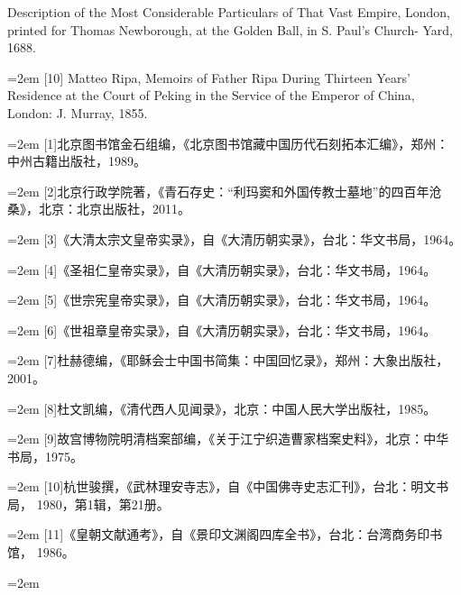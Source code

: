 Description of the Most Considerable Particulars of That Vast Empire, London,%
\space%
printed for Thomas Newborough, at the Golden Ball, in S. Paul's Church-%
Yard, 1688.%
\par
\noindent\hangindent=2em
[10] Matteo Ripa, Memoirs of Father Ripa During Thirteen Years' Residence at the Court%
\space%
of Peking in the Service of the Emperor of China, London: J. Murray, 1855.%
\par
\noindent\hangindent=2em
[1]北京图书馆金石组编，《北京图书馆藏中国历代石刻拓本汇编》，郑州：%
中州古籍出版社，1989。%
\par
\noindent\hangindent=2em
[2]北京行政学院著，《青石存史：“利玛窦和外国传教士墓地”的四百年沧%
桑》，北京：北京出版社，2011。%
\par
\noindent\hangindent=2em
[3]《大清太宗文皇帝实录》，自《大清历朝实录》，台北：华文书局，1964。%
\par
\noindent\hangindent=2em
[4]《圣祖仁皇帝实录》，自《大清历朝实录》，台北：华文书局，1964。%
\par
\noindent\hangindent=2em
[5]《世宗宪皇帝实录》，自《大清历朝实录》，台北：华文书局，1964。%
\par
\noindent\hangindent=2em
[6]《世祖章皇帝实录》，自《大清历朝实录》，台北：华文书局，1964。%
\par
\noindent\hangindent=2em
[7]杜赫德编，《耶稣会士中国书简集：中国回忆录》，郑州：大象出版社，%
2001。%
\par
\noindent\hangindent=2em
[8]杜文凯编，《清代西人见闻录》，北京：中国人民大学出版社，1985。%
\par
\noindent\hangindent=2em
[9]故宫博物院明清档案部编，《关于江宁织造曹家档案史料》，北京：中华%
书局，1975。%
\par
\noindent\hangindent=2em
[10]杭世骏撰，《武林理安寺志》，自《中国佛寺史志汇刊》，台北：明文书局，%
1980，第1辑，第21册。%
\par
\noindent\hangindent=2em
[11]《皇朝文献通考》，自《景印文渊阁四库全书》，台北：台湾商务印书馆，%
1986。%
\par
\noindent\hangindent=2em
